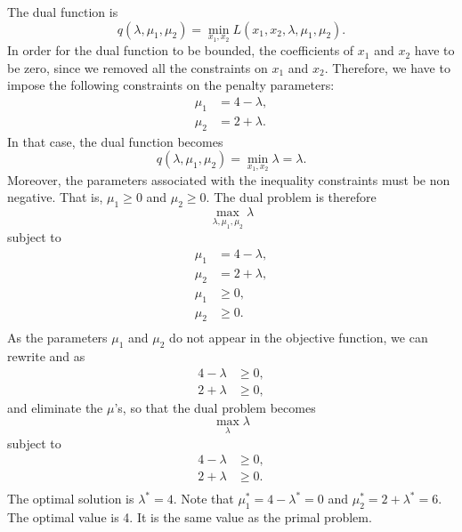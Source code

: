 The dual function is
\[
q(\lambda,\mu_1,\mu_2) = \min_{x_1,x_2} L(x_1,x_2,\lambda,\mu_1,\mu_2).
\]
In order for the dual function to be bounded, the coefficients of
$x_1$ and $x_2$ have to be zero, since we removed all the constraints
on $x_1$ and $x_2$. Therefore, we have to impose the
following constraints on the penalty parameters:
\begin{align}
  \mu_1&=4-\lambda, \label{eq:1}\\
  \mu_2&=2+\lambda. \label{eq:2}
\end{align}
In that case, the dual function becomes 
\[
q(\lambda,\mu_1,\mu_2) = \min_{x_1,x_2} \lambda = \lambda.
\]
Moreover, the parameters associated with the inequality constraints
must be non negative. That is, $\mu_1 \geq 0$ and $\mu_2 \geq
0$. The dual problem is therefore
\[
\max_{\lambda,\mu_1,\mu_2} \lambda
\]
subject to
\begin{align*}
  \mu_1&=4-\lambda, \\
  \mu_2&=2+\lambda, \\
  \mu_1 & \geq 0, \\
  \mu_2 & \geq 0. \\
\end{align*}
As the parameters $\mu_1$ and $\mu_2$ do not appear in the objective
function, we 
can rewrite
 and  as
\begin{align*}
  4-\lambda & \geq 0, \\ 
  2+\lambda & \geq 0,
\end{align*}
and eliminate the $\mu$'s, so that the dual problem becomes
\[
\max_{\lambda} \lambda
\]
subject to
\begin{align*}
  4-\lambda & \geq 0, \\
  2+\lambda & \geq 0. \\
\end{align*}
The optimal solution is $\lambda^* = 4$. Note that
$\mu^*_1=4-\lambda^*=0$ and $\mu^*_2 = 2 + \lambda^*=6$. The optimal
value is 4. It is the same value as the primal problem.

